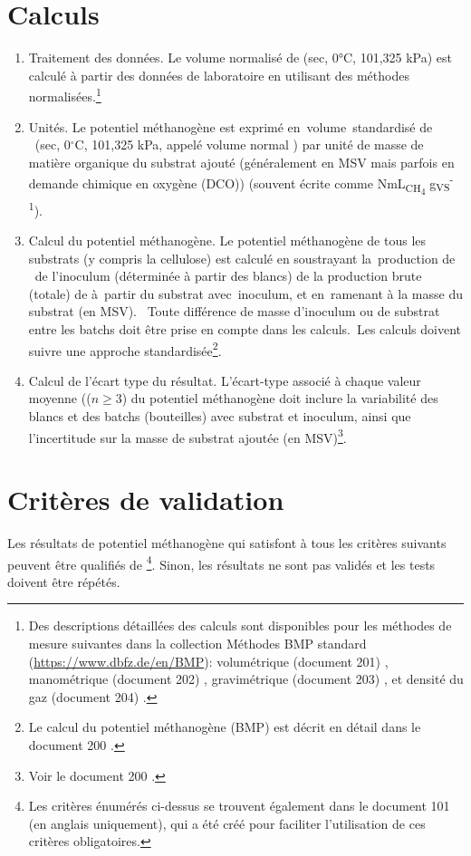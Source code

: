 \documentclass[]{article}
\begin{document}
\section{Calculs}
\label{sec:calculations}
\begin{enumerate}
  \item Traitement des données. 
    Le volume normalisé de  (sec, 0°C, 101,325 kPa) est calculé à partir des données de laboratoire en utilisant des méthodes normalisées.\footnote{
    Des descriptions détaillées des calculs sont disponibles pour les méthodes de mesure suivantes dans la collection Méthodes BMP standard (\url{https://www.dbfz.de/en/BMP}): volumétrique (document 201) \citep{BMPdoc201vol}, manométrique (document 202) \citep{BMPdoc202man}, gravimétrique (document 203) \citep{BMPdoc203grav}, et densité du gaz (document 204) \citep{BMPdoc204gasdens}.
    }
  \item Unités. 
    Le potentiel méthanogène est exprimé en volume standardisé de  (sec, 0$^\circ$C, 101,325 kPa, appelé volume \guillemotleft normal \guillemotright) par unité de masse de matière organique du substrat ajouté (généralement en MSV mais parfois en demande chimique en oxygène (DCO)) (souvent écrite comme NmL\textsubscript{CH\textsubscript{4}} g\textsubscript{VS}\textsuperscript{-1}). 
  \item Calcul du potentiel méthanogène.
    Le potentiel méthanogène de tous les substrats (y compris la cellulose) est calculé en soustrayant la production de  de l’inoculum (déterminée à partir des blancs) de la production brute (totale) de  à partir du substrat avec inoculum, et en ramenant à la masse du substrat (en MSV). 
    Toute différence de masse d'inoculum ou de substrat entre les batchs doit être prise en compte dans les calculs. Les calculs doivent suivre une approche standardisée\footnote{
    Le calcul du potentiel méthanogène (BMP) est décrit en détail dans le document 200 \citep{BMPdoc200BMP}.
    }.
  \item Calcul de l’écart type du résultat. 
    L'écart-type associé à chaque valeur moyenne (($n \ge 3$) du potentiel méthanogène doit inclure la variabilité des blancs et des batchs (bouteilles) avec substrat et inoculum, ainsi que l'incertitude sur la masse de substrat ajoutée (en MSV)\footnote{
      Voir le document 200 \citep{BMPdoc200BMP}.
    }.
\end{enumerate}

\section{Critères de validation}
\label{sec:crit}
Les résultats de potentiel méthanogène qui satisfont à tous les critères suivants peuvent être qualifiés de \guillemotright \footnote{
Les critères énumérés ci-dessus se trouvent également dans le document 101 \citep{BMPdoc101val} (en anglais uniquement), qui a été créé pour faciliter l’utilisation de  ces critères obligatoires.
}.
Sinon, les résultats ne sont pas validés et les tests doivent être répétés.
\end{document}
